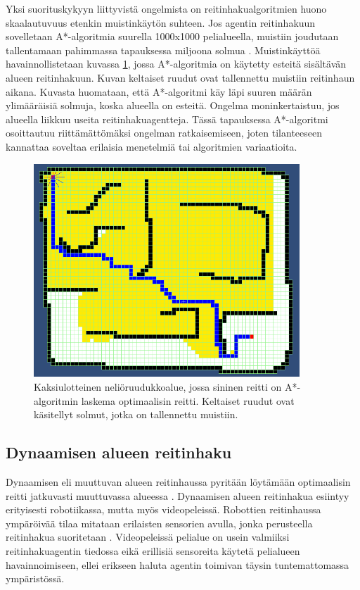 \documentclass[utf8]{gradu3}
\begin{document}
Yksi suorituskykyyn liittyvistä ongelmista on reitinhakualgoritmien huono skaalautuvuus etenkin muistinkäytön suhteen. Jos agentin reitinhakuun sovelletaan A*-algoritmia suurella 1000x1000 pelialueella, muistiin joudutaan tallentamaan pahimmassa tapauksessa miljoona solmua \parencite{cui2011based,duchovn2014path}. Muistinkäyttöä havainnollistetaan kuvassa \ref{astarmemory}, jossa A*-algoritmia on käytetty esteitä sisältävän alueen reitinhakuun. Kuvan keltaiset ruudut ovat tallennettu muistiin reitinhaun aikana. Kuvasta huomataan, että A*-algoritmi käy läpi suuren määrän ylimääräisiä solmuja, koska alueella on esteitä. Ongelma moninkertaistuu, jos alueella liikkuu useita reitinhakuagentteja. Tässä tapauksessa A*-algoritmi osoittautuu riittämättömäksi ongelman ratkaisemiseen, joten tilanteeseen kannattaa soveltaa erilaisia menetelmiä tai algoritmien variaatioita.

\begin{figure}[h]
\centering
\includegraphics[width=10cm]{a_star_memory.png}
\caption{Kaksiulotteinen neliöruudukkoalue, jossa sininen reitti on A*-algoritmin laskema optimaalisin reitti. Keltaiset ruudut ovat käsitellyt solmut, jotka on tallennettu muistiin.}
\label{astarmemory}
\end{figure}

\subsection{Dynaamisen alueen reitinhaku}

Dynaamisen eli muuttuvan alueen reitinhaussa pyritään löytämään optimaalisin reitti jatkuvasti muuttuvassa alueessa \parencite{lawande2022systematic}. Dynaamisen alueen reitinhakua esiintyy erityisesti robotiikassa, mutta myös videopeleissä. Robottien reitinhaussa ympäröivää tilaa mitataan erilaisten sensorien avulla, jonka perusteella reitinhakua suoritetaan \parencite{rahmani2022towards}. Videopeleissä pelialue on usein valmiiksi reitinhakuagentin tiedossa eikä erillisiä sensoreita käytetä pelialueen havainnoimiseen, ellei erikseen haluta agentin toimivan täysin tuntemattomassa ympäristössä.
\end{document}
